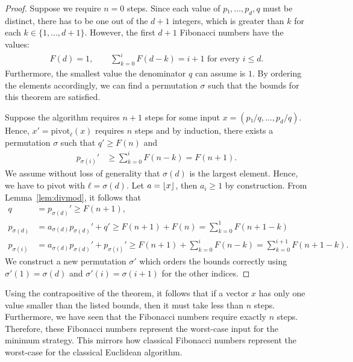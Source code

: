 \begin{proof}
  Suppose we require $n = 0$ steps.
  Since each value of $p₁, …, p_d, q$ must be distinct,
  there has to be one out of the $d+1$ integers,
  which is greater than $k$ for each $k ∈ \{1, …, d+1\}$.
  However, the first $d+1$ Fibonacci numbers have the values:
  \begin{align*}
    F(d) = 1,
    \qquad
    \sum_{k=0}^i F(d - k) = i + 1 \text{ for every } i ≤ d.
  \end{align*}
  Furthermore, the smallest value the denominator $q$ can assume is $1$.
  By ordering the elements accordingly,
  we can find a permutation $σ$ such that
  the bounds for this theorem are satisfied.

  Suppose the algorithm requires $n+1$ steps for some input $x = (p₁/q, …, p_d/q)$.
  Hence, $x' = \mathrm{pivot}_ℓ(x)$ requires $n$ steps and by induction,
  there exists a permutation $σ$ such that $q' ≥ F(n)$ and
  \begin{align*}
    p_{σ(i)}' & ≥ \sum_{k=0}^i F(n - k) = F(n + 1).
  \end{align*}
  We assume without loss of generality that $σ(d)$ is the largest element.
  Hence, we have to pivot with $ℓ = σ(d)$.
  Let $a = \left\lfloor x\right\rfloor$, then $a_i ≥ 1$ by construction.
  From Lemma~\ref{lem:divmod}, it follows that
  \begin{align*}
    q        & = p_{σ(d)}' ≥ F(n+1),                                                   \\
    p_{σ(d)} & = a_{σ(d)} p_{σ(d)}' + q' ≥ F(n + 1) + F(n) = \sum_{k=0}^1 F(n + 1 - k) \\
    p_{σ(i)} & = a_{σ(d)} p_{σ(d)}' + p_{σ(i)}' ≥ F(n + 1) + ∑_{k=0}^i F(n - k) = ∑_{k=0}^{i+1} F(n + 1 - k).
  \end{align*}
  We construct a new permutation $σ'$ which orders the bounds correctly
  using $σ'(1) = σ(d)$ and $σ'(i) = σ(i+1)$ for the other indices.
\end{proof}

Using the contrapositive of the theorem, it follows that if a vector $x$
has only one value smaller than the listed bounds, then it must take less than
$n$ steps.
Furthermore, we have seen that the Fibonacci numbers require exactly $n$ steps.
Therefore, these Fibonacci numbers represent the worst-case input for the
minimum strategy.
This mirrors how classical Fibonacci numbers represent the worst-case for the
classical Euclidean algorithm.

